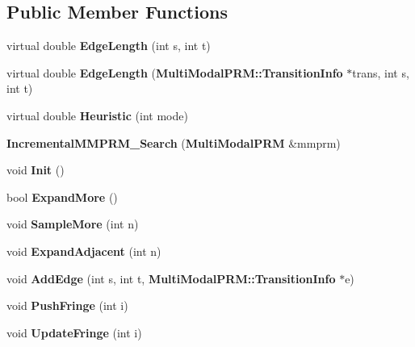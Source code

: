 \subsection*{Public Member Functions}
\begin{DoxyCompactItemize}
\item 
virtual double {\bfseries Edge\+Length} (int s, int t)\label{classIncrementalMMPRM__Search_a2b1b3c0b95f180c4933a46a9416cc6aa}

\item 
virtual double {\bfseries Edge\+Length} ({\bf Multi\+Modal\+P\+R\+M\+::\+Transition\+Info} $\ast$trans, int s, int t)\label{classIncrementalMMPRM__Search_af60d305062ed653ca312702a15d2cdb2}

\item 
virtual double {\bfseries Heuristic} (int mode)\label{classIncrementalMMPRM__Search_ae27d32ac05bc4dc3b9b6e510be5dcdc3}

\item 
{\bfseries Incremental\+M\+M\+P\+R\+M\+\_\+\+Search} ({\bf Multi\+Modal\+P\+RM} \&mmprm)\label{classIncrementalMMPRM__Search_ad2ab253f2d3002422af5e3187ba4822f}

\item 
void {\bfseries Init} ()\label{classIncrementalMMPRM__Search_ad7d2e7b4b9170945c740c246803918fa}

\item 
bool {\bfseries Expand\+More} ()\label{classIncrementalMMPRM__Search_a9e902b8077113d8255ec54be30492d46}

\item 
void {\bfseries Sample\+More} (int n)\label{classIncrementalMMPRM__Search_a65924b1da473cddf709676687d6499c9}

\item 
void {\bfseries Expand\+Adjacent} (int n)\label{classIncrementalMMPRM__Search_a750b3b2a518bc9f0046c2709a6ff227b}

\item 
void {\bfseries Add\+Edge} (int s, int t, {\bf Multi\+Modal\+P\+R\+M\+::\+Transition\+Info} $\ast$e)\label{classIncrementalMMPRM__Search_a7837e08979f6e1f7e287470f3adebce7}

\item 
void {\bfseries Push\+Fringe} (int i)\label{classIncrementalMMPRM__Search_aaaa2cc88ea58e2a53e109dfd251e2264}

\item 
void {\bfseries Update\+Fringe} (int i)\label{classIncrementalMMPRM__Search_a32686f9ea35015d5e4c4f2b39c3a45d6}


\end{DoxyCompactItemize}
